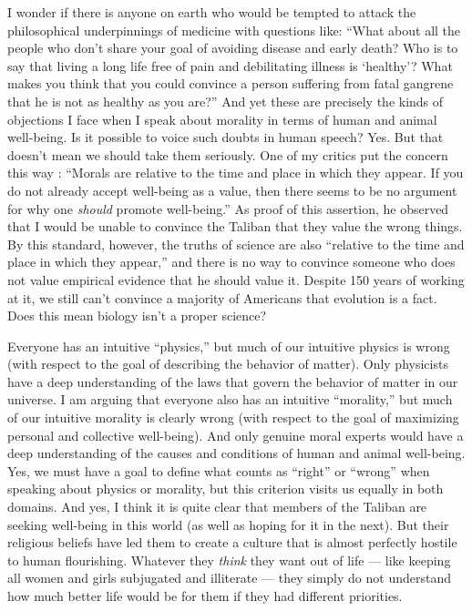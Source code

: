 \documentclass[a4paper,14pt]{extbook}
\begin{document}
I wonder if there is anyone on earth who would be tempted to attack the philosophical underpinnings of medicine with questions like: ``What about all the people who don't share your goal of avoiding disease and early death?
Who is to say that living a long life free of pain and debilitating illness is `healthy'?
What makes you think that you could convince a person suffering from fatal gangrene that he is not as healthy as you are?''
And yet these are precisely the kinds of objections I face when I speak about morality in terms of human and animal well-being.
Is it possible to voice such doubts in human speech?
Yes.
But that doesn't mean we should take them seriously.
One of my critics put the concern this way :
``Morals are relative to the time and place in which they appear.
If you do not already accept well-being as a value, then there seems to be no argument for why one \textit{should} promote well-being.''
As proof of this assertion, he observed that I would be unable to convince the Taliban that they value the wrong things.
By this standard, however, the truths of science are also ``relative to the time and place in which they appear,'' and there is no way to convince someone who does not value empirical evidence that he should value it.
Despite 150 years of working at it, we still can't convince a majority of Americans that evolution is a fact.
Does this mean biology isn't a proper science?

Everyone has an intuitive ``physics,'' but much of our intuitive physics is wrong (with respect to the goal of describing the behavior of matter).
Only physicists have a deep understanding of the laws that govern the behavior of matter in our universe.
I am arguing that everyone also has an intuitive ``morality,'' but much of our intuitive morality is clearly wrong (with respect to the goal of maximizing personal and collective well-being).
And only genuine moral experts would have a deep understanding of the causes and conditions of human and animal well-being.
Yes, we must have a goal to define what counts as ``right'' or ``wrong'' when speaking about physics or morality, but this criterion visits us equally in both domains.
And yes, I think it is quite clear that members of the Taliban are seeking well-being in this world (as well as hoping for it in the next).
But their religious beliefs have led them to create a culture that is almost perfectly hostile to human flourishing.
Whatever they \textit{think} they want out of life --- like keeping all women and girls subjugated and illiterate --- they simply do not understand how much better life would be for them if they had different priorities.
\end{document}
